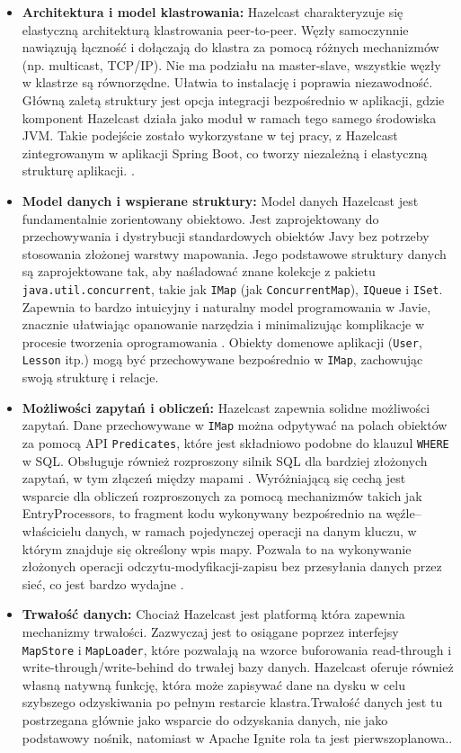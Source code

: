 \begin{itemize}
    \item \textbf{Architektura i model klastrowania:} Hazelcast charakteryzuje się elastyczną architekturą klastrowania peer-to-peer. Węzły samoczynnie nawiązują łączność i dołączają do klastra za pomocą różnych mechanizmów (np. multicast, TCP/IP). Nie ma podziału na master-slave, wszystkie węzły w klastrze są równorzędne. Ułatwia to instalację i poprawia niezawodność. Główną zaletą struktury jest opcja integracji bezpośrednio w aplikacji, gdzie komponent Hazelcast działa jako moduł w ramach tego samego środowiska JVM. Takie podejście zostało wykorzystane w tej pracy, z Hazelcast zintegrowanym w aplikacji Spring Boot, co tworzy niezależną i elastyczną strukturę aplikacji. \cite{hazelcast-docs}.
    \item \textbf{Model danych i wspierane struktury:} Model danych Hazelcast jest fundamentalnie zorientowany obiektowo. Jest zaprojektowany do przechowywania i dystrybucji standardowych obiektów Javy bez potrzeby stosowania złożonej warstwy mapowania. Jego podstawowe struktury danych są zaprojektowane tak, aby naśladować znane kolekcje z pakietu \texttt{java.util.concurrent}, takie jak \texttt{IMap} (jak \texttt{ConcurrentMap}), \texttt{IQueue} i \texttt{ISet}. Zapewnia to bardzo intuicyjny i naturalny model programowania w Javie, znacznie ułatwiając opanowanie narzędzia i minimalizując komplikacje w procesie tworzenia oprogramowania \cite{hazelcast-docs}. Obiekty domenowe aplikacji (\texttt{User}, \texttt{Lesson} itp.) mogą być przechowywane bezpośrednio w \texttt{IMap}, zachowując swoją strukturę i relacje.
    \item \textbf{Możliwości zapytań i obliczeń:} Hazelcast zapewnia solidne możliwości zapytań. Dane przechowywane w \texttt{IMap} można odpytywać na polach obiektów za pomocą API \texttt{Predicates}, które jest składniowo podobne do klauzul \texttt{WHERE} w SQL. Obsługuje również rozproszony silnik SQL dla bardziej złożonych zapytań, w tym złączeń między mapami \cite{hazelcast-docs}. Wyróżniającą się cechą jest wsparcie dla obliczeń rozproszonych za pomocą mechanizmów takich jak EntryProcessors, to fragment kodu wykonywany bezpośrednio na węźle–właścicielu danych, w ramach pojedynczej operacji na danym kluczu, w którym znajduje się określony wpis mapy. Pozwala to na wykonywanie złożonych operacji odczytu-modyfikacji-zapisu bez przesyłania danych przez sieć, co jest bardzo wydajne \cite{hazelcast-docs}.
    \item \textbf{Trwałość danych:} Chociaż Hazelcast jest platformą która zapewnia mechanizmy trwałości. Zazwyczaj jest to osiągane poprzez interfejsy \texttt{MapStore} i \texttt{MapLoader}, które pozwalają na wzorce buforowania read-through i write-through/write-behind do trwałej bazy danych. Hazelcast oferuje również własną natywną funkcję, która może zapisywać dane na dysku w celu szybszego odzyskiwania po pełnym restarcie klastra.Trwałość  danych jest tu postrzegana głównie jako wsparcie do odzyskania danych, nie jako podstawowy nośnik, natomiast w Apache Ignite rola ta jest pierwszoplanowa.\cite{hazelcast-docs}.

\end{itemize}
